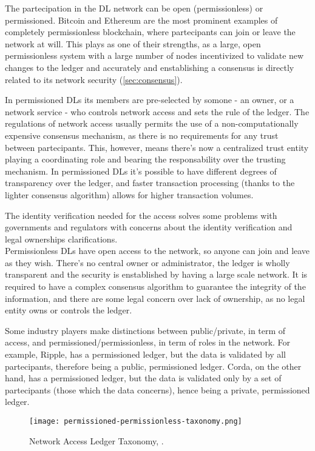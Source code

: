The partecipation in the DL network can be open (permissionless) or permissioned. Bitcoin and Ethereum are the most prominent examples of completely permissionless blockchain, where partecipants can join or leave the network at will. This plays as one of their strengths, as a large, open permissionless system with a large number of nodes incentivized to validate new changes to the ledger and accurately and enstablishing a consensus is directly related to its network security (\ref{sec:consensus}).

In permissioned DLs its members are pre-selected by somone - an owner, or a network service - who controls network access and sets the rule of the ledger. The regulations of network access usually permits the use of a non-computationally expensive consensus mechanism, as there is no requirements for any trust between partecipants. This, however, means there's now a centralized trust entity playing a coordinating role and bearing the responsability over the trusting mechanism. 
In permissioned DLs it's possible to have different degrees of transparency over the ledger, and faster transaction processing (thanks to the lighter consensus algorithm) allows for higher transaction volumes.

The identity verification needed for the access solves some problems with governments and regulators with concerns about the identity verification and legal ownerships clarifications. \\

Permissionless DLs have open access to the network, so anyone can join and leave as they wish. There's no central owner or administrator, the ledger is wholly transparent and the security is enstablished by having a large scale network. It is required to have a complex consensus algorithm to guarantee the integrity of the information, and there are some legal concern over lack of ownership, as no legal entity owns or controls the ledger.

Some industry players make distinctions between public/private, in term of access, and permissioned/permissionless, in term of roles in the network. For example, Ripple, has a permissioned ledger, but the data is validated by all partecipants, therefore being a public, permissioned ledger. Corda, on the other hand, has a permissioned ledger, but the data is validated only by a set of partecipants (those which the data concerns), hence being a private, permissioned ledger.

\begin{figure}[h]
    \centering
    \texttt{[image: permissioned-permissionless-taxonomy.png]}
    \caption{
        Network Access Ledger Taxonomy, \cite{ukgovdltpaper}. 
        }
\end{figure}

